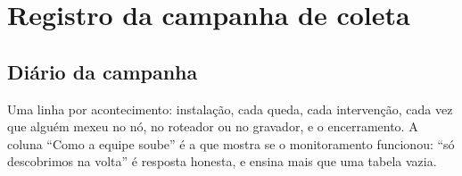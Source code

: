 \chapter{Registro da campanha de coleta}
\label{ap:campanha}

\section*{Diário da campanha}
{}

\begin{orientacao}
Uma linha por acontecimento: instalação, cada queda, cada intervenção,
cada vez que alguém mexeu no nó, no roteador ou no gravador, e o
encerramento. A coluna \enquote{Como a equipe soube} é a que mostra se o
monitoramento funcionou: \enquote{só descobrimos na volta} é resposta
honesta, e ensina mais que uma tabela vazia.
\end{orientacao}

